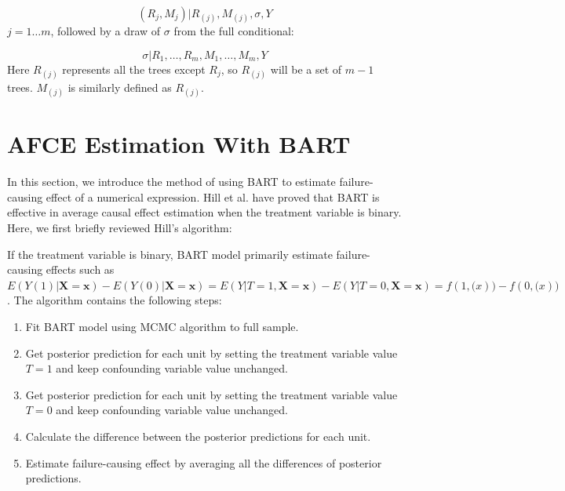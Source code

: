 \begin{equation*}
(R_j,M_j)|R_{(j)}, M_{(j)}, \sigma, Y
\end{equation*}
$j=1 \ldots m$, followed by a draw of $\sigma$ from the full conditional:

\begin{equation*}
\sigma |{R_1}, \ldots ,{R_m},{M_1}, \ldots ,{M_m},Y
\end{equation*}
Here $R_{(j)}$ represents all the trees except $R_j$, so $R_{(j)}$ will be a set of $m-1$ trees. $M_{(j)}$ is similarly defined as $R_{(j)}$.

\section{AFCE Estimation With BART}\label{BARTafce}%

In this section, we introduce the method of using BART to estimate failure-causing effect of a numerical expression. Hill et al. have proved that BART is effective in average causal effect estimation when the treatment variable is binary. Here, we first briefly reviewed Hill’s algorithm:

If the treatment variable is binary, BART model primarily estimate failure-causing effects such as $E(Y(1)|\pmb{X}=\pmb{x}) - E(Y(0)|\pmb{X}=\pmb{x})=E(Y|T=1, \pmb{X}=\pmb{x})-E(Y|T=0, \pmb{X}=\pmb{x})=f(1,\pmb(x))-f(0,\pmb(x))$ . The algorithm contains the following steps:
\begin{enumerate}
\item Fit BART model using MCMC algorithm to full sample.
\item Get posterior prediction for each unit by setting the treatment variable value $T=1$ and keep confounding variable value unchanged.
\item Get posterior prediction for each unit by setting the treatment variable value $T=0$ and keep confounding variable value unchanged.
\item	Calculate the difference between the posterior predictions for each unit.
\item Estimate failure-causing effect by averaging all the differences of posterior predictions.
\end{enumerate}

